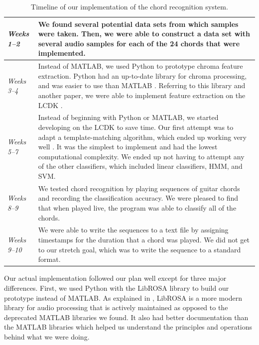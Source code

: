 \documentclass[journal]{IEEEtran}
\begin{document}
\begin{table}[ht]
    \centering
    \caption{Timeline of our implementation of the chord recognition system.}
    \begin{tabularx}{0.95\linewidth}{|>{\hsize=0.4\hsize}X|>{\hsize=1.6\hsize}X|}
        \hline
            \textit{Weeks 1--2}
            & 
            We found several potential data sets from which samples were taken.
            Then, we were able to construct a data set with several audio samples for each of the 24 chords that were implemented. \\
        \hline
            \textit{Weeks 3--4}
            &
            Instead of MATLAB, we used Python to prototype chroma feature extraction.
            Python had an up-to-date library for chroma processing, and was easier to use than MATLAB \cite{librosa}.
            Referring to this library and another paper, we were able to implement feature extraction on the LCDK \cite{librosa, stark}. \\
        \hline
            \textit{Weeks 5--7}
            &
            Instead of beginning with Python or MATLAB, we started developing on the LCDK to save time.
            Our first attempt was to adapt a template-matching algorithm, which ended up working very well \cite{stark}.
            It was the simplest to implement and had the lowest computational complexity.
            We ended up not having to attempt any of the other classifiers, which included linear classifiers, HMM, and SVM. \\
        \hline
            \textit{Weeks 8--9}
            &
            We tested chord recognition by playing sequences of guitar chords and recording the classification accuracy.
            We were pleased to find that when played live, the program was able to classify all of the chords. \\
        \hline
            \textit{Weeks 9--10}
            &
            We were able to write the sequences to a text file by assigning timestamps for the duration that a chord was played.
            We did not get to our stretch goal, which was to write the sequence to a standard format. \\
        \hline
    \end{tabularx}
    \label{tab:implementation}
\end{table}

Our actual implementation followed our plan well except for three major differences.
First, we used Python with the LibROSA library to build our prototype instead of MATLAB.
As explained in , LibROSA is a more modern library for audio processing that is actively maintained as opposed to the deprecated MATLAB libraries we found.
It also had better documentation than the MATLAB libraries which helped us understand the principles and operations behind what we were doing.
\end{document}
